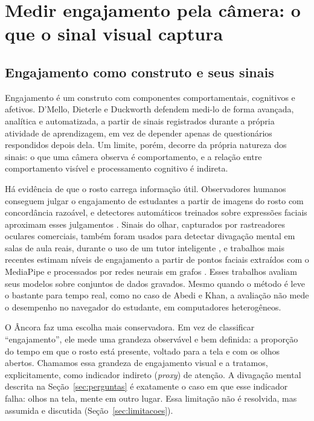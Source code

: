 \documentclass[portuguese,oneside]{tcc}
\newcommand{\ferramenta}{Âncora\xspace}
\newcommand{\estr}[1]{\emph{#1}}
\begin{document}
\section{\label{sec:engajamento}Medir engajamento pela câmera: o que o sinal visual captura}

\subsection{Engajamento como construto e seus sinais}

Engajamento é um construto com componentes comportamentais, cognitivos e afetivos. D'Mello, Dieterle e Duckworth \cite{DDD17} defendem medi-lo de forma avançada, analítica e automatizada, a partir de sinais registrados durante a própria atividade de aprendizagem, em vez de depender apenas de questionários respondidos depois dela. Um limite, porém, decorre da própria natureza dos sinais: o que uma câmera observa é comportamento, e a relação entre comportamento visível e processamento cognitivo é indireta.

Há evidência de que o rosto carrega informação útil. Observadores humanos conseguem julgar o engajamento de estudantes a partir de imagens do rosto com concordância razoável, e detectores automáticos treinados sobre expressões faciais aproximam esses julgamentos \cite{WSL14}. Sinais do olhar, capturados por rastreadores oculares comerciais, também foram usados para detectar divagação mental em salas de aula reais, durante o uso de um tutor inteligente \cite{HKM19}, e trabalhos mais recentes estimam níveis de engajamento a partir de pontos faciais extraídos com o MediaPipe e processados por redes neurais em grafos \cite{AK24}. Esses trabalhos avaliam seus modelos sobre conjuntos de dados gravados. Mesmo quando o método é leve o bastante para tempo real, como no caso de Abedi e Khan, a avaliação não mede o desempenho no navegador do estudante, em computadores heterogêneos.

O \ferramenta faz uma escolha mais conservadora. Em vez de classificar ``engajamento'', ele mede uma grandeza observável e bem definida: a proporção do tempo em que o rosto está presente, voltado para a tela e com os olhos abertos. Chamamos essa grandeza de engajamento visual e a tratamos, explicitamente, como indicador indireto (\estr{proxy}) de atenção. A divagação mental descrita na Seção~\ref{sec:perguntas} é exatamente o caso em que esse indicador falha: olhos na tela, mente em outro lugar. Essa limitação não é resolvida, mas assumida e discutida (Seção~\ref{sec:limitacoes}).
\end{document}
